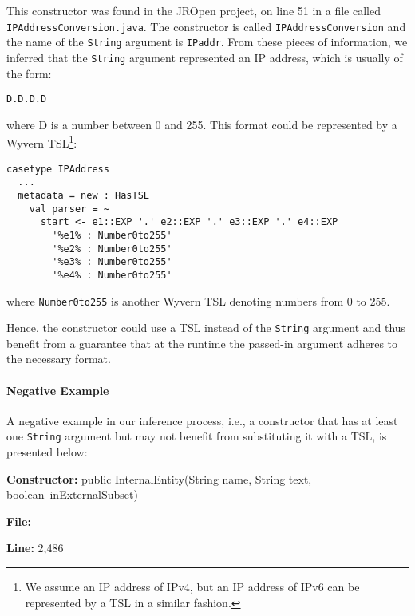 \vspace{10px}


This constructor was found in the JROpen project, on line 51 in a file called \mbox{\lstinline{IPAddressConversion.java}}. The constructor is called \lstinline{IPAddressConversion} and the name of the \lstinline{String} argument is \lstinline{IPaddr}. From these pieces of information, we inferred that the \lstinline{String} argument represented an IP address, which is usually of the form:

\begin{lstlisting}
D.D.D.D
\end{lstlisting}

\noindent where D is a number between 0 and 255. This format could be represented by a Wyvern TSL\footnote{We assume an IP address of IPv4, but an IP address of IPv6 can be represented by a TSL in a similar fashion.}:

\begin{lstlisting}
casetype IPAddress
  ...
  metadata = new : HasTSL
    val parser = ~
      start <- e1::EXP '.' e2::EXP '.' e3::EXP '.' e4::EXP
        '%e1% : Number0to255'
        '%e2% : Number0to255'
        '%e3% : Number0to255'
        '%e4% : Number0to255'
\end{lstlisting}

\noindent where \lstinline{Number0to255} is another Wyvern TSL denoting numbers from 0 to 255.

Hence, the constructor could use a TSL instead of the \lstinline{String} argument and thus benefit from a guarantee that at the runtime the passed-in argument adheres to the necessary format.


\paragraph{Negative Example} A negative example in our inference process, i.e., a constructor that has at least one \lstinline{String} argument but may not benefit from substituting it with a TSL, is presented below:

\vspace{10px}

\begin{small}

\noindent \textbf{Constructor:} public InternalEntity(String name, String text, \mbox{boolean inExternalSubset})

\noindent \textbf{File:} 

\noindent \textbf{Line:} 2,486

\end{small}

